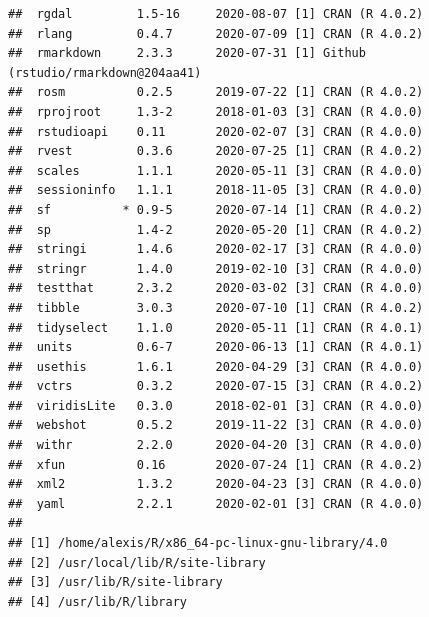 \documentclass[
  french,
]{book}
\begin{document}
\begin{verbatim}
##  rgdal         1.5-16     2020-08-07 [1] CRAN (R 4.0.2)                    
##  rlang         0.4.7      2020-07-09 [1] CRAN (R 4.0.2)                    
##  rmarkdown     2.3.3      2020-07-31 [1] Github (rstudio/rmarkdown@204aa41)
##  rosm          0.2.5      2019-07-22 [1] CRAN (R 4.0.2)                    
##  rprojroot     1.3-2      2018-01-03 [3] CRAN (R 4.0.0)                    
##  rstudioapi    0.11       2020-02-07 [3] CRAN (R 4.0.0)                    
##  rvest         0.3.6      2020-07-25 [1] CRAN (R 4.0.2)                    
##  scales        1.1.1      2020-05-11 [3] CRAN (R 4.0.0)                    
##  sessioninfo   1.1.1      2018-11-05 [3] CRAN (R 4.0.0)                    
##  sf          * 0.9-5      2020-07-14 [1] CRAN (R 4.0.2)                    
##  sp            1.4-2      2020-05-20 [1] CRAN (R 4.0.2)                    
##  stringi       1.4.6      2020-02-17 [3] CRAN (R 4.0.0)                    
##  stringr       1.4.0      2019-02-10 [3] CRAN (R 4.0.0)                    
##  testthat      2.3.2      2020-03-02 [3] CRAN (R 4.0.0)                    
##  tibble        3.0.3      2020-07-10 [1] CRAN (R 4.0.2)                    
##  tidyselect    1.1.0      2020-05-11 [1] CRAN (R 4.0.1)                    
##  units         0.6-7      2020-06-13 [1] CRAN (R 4.0.1)                    
##  usethis       1.6.1      2020-04-29 [3] CRAN (R 4.0.0)                    
##  vctrs         0.3.2      2020-07-15 [3] CRAN (R 4.0.2)                    
##  viridisLite   0.3.0      2018-02-01 [3] CRAN (R 4.0.0)                    
##  webshot       0.5.2      2019-11-22 [3] CRAN (R 4.0.0)                    
##  withr         2.2.0      2020-04-20 [3] CRAN (R 4.0.0)                    
##  xfun          0.16       2020-07-24 [1] CRAN (R 4.0.2)                    
##  xml2          1.3.2      2020-04-23 [3] CRAN (R 4.0.0)                    
##  yaml          2.2.1      2020-02-01 [3] CRAN (R 4.0.0)                    
## 
## [1] /home/alexis/R/x86_64-pc-linux-gnu-library/4.0
## [2] /usr/local/lib/R/site-library
## [3] /usr/lib/R/site-library
## [4] /usr/lib/R/library
\end{verbatim}

  
\end{document}
